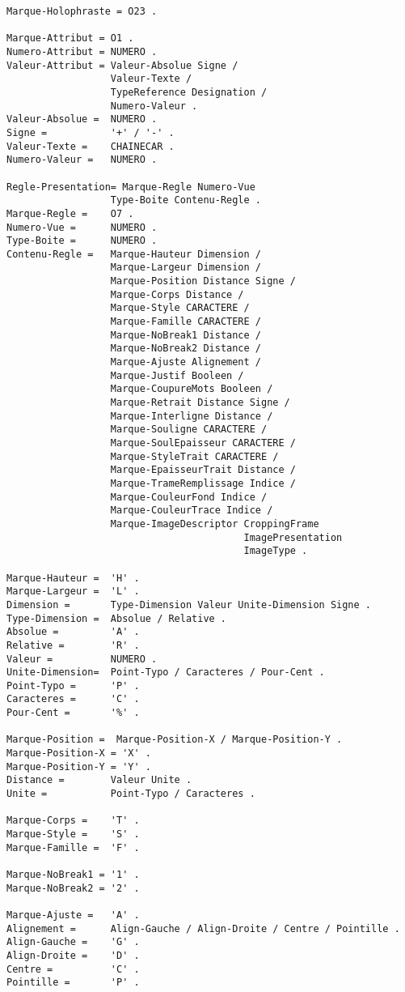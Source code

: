 \begin{verbatim}
Marque-Holophraste = O23 .

Marque-Attribut = O1 .
Numero-Attribut = NUMERO .
Valeur-Attribut = Valeur-Absolue Signe /
                  Valeur-Texte /
                  TypeReference Designation /
                  Numero-Valeur .
Valeur-Absolue =  NUMERO .
Signe =           '+' / '-' .
Valeur-Texte =    CHAINECAR .
Numero-Valeur =   NUMERO .

Regle-Presentation= Marque-Regle Numero-Vue
                  Type-Boite Contenu-Regle .
Marque-Regle =    O7 .
Numero-Vue =      NUMERO .
Type-Boite =      NUMERO .
Contenu-Regle =   Marque-Hauteur Dimension /
                  Marque-Largeur Dimension /
                  Marque-Position Distance Signe /
                  Marque-Corps Distance /
                  Marque-Style CARACTERE /
                  Marque-Famille CARACTERE /
                  Marque-NoBreak1 Distance /
                  Marque-NoBreak2 Distance /
                  Marque-Ajuste Alignement /
                  Marque-Justif Booleen /
                  Marque-CoupureMots Booleen /
                  Marque-Retrait Distance Signe /
                  Marque-Interligne Distance /
                  Marque-Souligne CARACTERE /
                  Marque-SoulEpaisseur CARACTERE /
                  Marque-StyleTrait CARACTERE /
                  Marque-EpaisseurTrait	Distance /
                  Marque-TrameRemplissage Indice /
                  Marque-CouleurFond Indice /
                  Marque-CouleurTrace Indice /
                  Marque-ImageDescriptor CroppingFrame 
                                         ImagePresentation 
                                         ImageType .

Marque-Hauteur =  'H' .
Marque-Largeur =  'L' .
Dimension =       Type-Dimension Valeur Unite-Dimension Signe .
Type-Dimension =  Absolue / Relative .
Absolue =         'A' .
Relative =        'R' .
Valeur =          NUMERO .
Unite-Dimension=  Point-Typo / Caracteres / Pour-Cent .
Point-Typo =      'P' .
Caracteres =      'C' .
Pour-Cent =       '%' .

Marque-Position =  Marque-Position-X / Marque-Position-Y .
Marque-Position-X = 'X' .
Marque-Position-Y = 'Y' .
Distance =        Valeur Unite .
Unite =           Point-Typo / Caracteres .

Marque-Corps =    'T' .
Marque-Style =    'S' .
Marque-Famille =  'F' .

Marque-NoBreak1 = '1' .
Marque-NoBreak2 = '2' .

Marque-Ajuste =   'A' .
Alignement =      Align-Gauche / Align-Droite / Centre / Pointille .
Align-Gauche =    'G' .
Align-Droite =    'D' .
Centre =          'C' .
Pointille =       'P' .


\end{verbatim}
